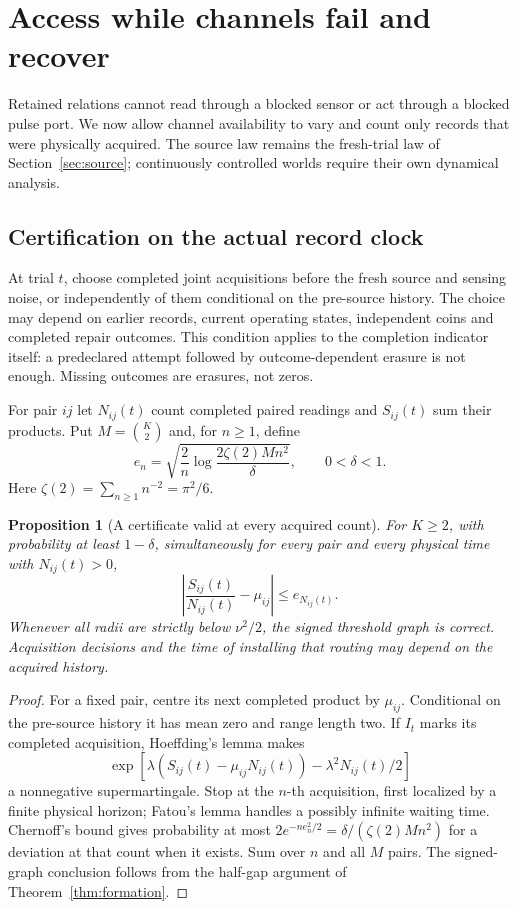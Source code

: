 \documentclass[11pt]{article}
\newtheorem{proposition}[theorem]{Proposition}
\theoremstyle{definition}
\theoremstyle{remark}
\begin{document}
\section{Access while channels fail and recover}
\label{sec:availability}

Retained relations cannot read through a blocked sensor or act through a blocked pulse port. We now allow channel availability to vary and count only records that were physically acquired. The source law remains the fresh-trial law of Section~\ref{sec:source}; continuously controlled worlds require their own dynamical analysis.

\subsection{Certification on the actual record clock}

At trial $t$, choose completed joint acquisitions before the fresh source and sensing noise, or independently of them conditional on the pre-source history. The choice may depend on earlier records, current operating states, independent coins and completed repair outcomes. This condition applies to the completion indicator itself: a predeclared attempt followed by outcome-dependent erasure is not enough. Missing outcomes are erasures, not zeros.

For pair $ij$ let $N_{ij}(t)$ count completed paired readings and $S_{ij}(t)$ sum their products. Put $M=\binom K2$ and, for $n\ge1$, define
\begin{equation}\label{eq:radius}
 e_n=\sqrt{\frac2n\log\frac{2\zeta(2) M n^2}{\delta}},\qquad 0<\delta<1.
\end{equation}
Here $\zeta(2)=\sum_{n\ge1}n^{-2}=\pi^2/6$.

\begin{proposition}[A certificate valid at every acquired count]
\label{prop:recordclock}
For $K\ge2$, with probability at least $1-\delta$, simultaneously for every pair and every physical time with $N_{ij}(t)>0$,
\[
 \left|\frac{S_{ij}(t)}{N_{ij}(t)}-\mu_{ij}\right|
 \le e_{N_{ij}(t)}.
\]
Whenever all radii are strictly below $\nu^2/2$, the signed threshold graph is correct. Acquisition decisions and the time of installing that routing may depend on the acquired history.
\end{proposition}
\begin{proof}
For a fixed pair, centre its next completed product by $\mu_{ij}$. Conditional on the pre-source history it has mean zero and range length two. If $I_t$ marks its completed acquisition, Hoeffding's lemma makes
\[
 \exp\!\left[\lambda(S_{ij}(t)-\mu_{ij}N_{ij}(t))
 -\lambda^2N_{ij}(t)/2\right]
\]
a nonnegative supermartingale. Stop at the $n$-th acquisition, first localized by a finite physical horizon; Fatou's lemma handles a possibly infinite waiting time. Chernoff's bound gives probability at most $2e^{-ne_n^2/2}=\delta/(\zeta(2)Mn^2)$ for a deviation at that count when it exists. Sum over $n$ and all $M$ pairs. The signed-graph conclusion follows from the half-gap argument of Theorem~\ref{thm:formation}.
\end{proof}
\end{document}
